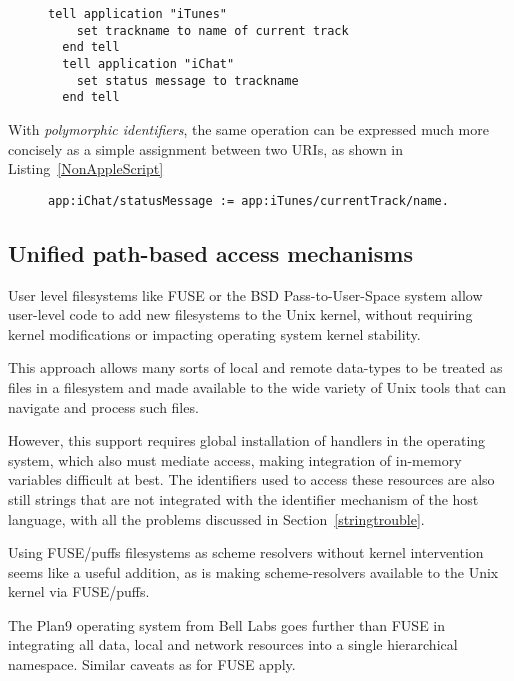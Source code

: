 \documentclass[preprint,authoryear]{acm_proc_article-sp}
\begin{document}
\begin{figure}[htbp]
\begin{lstlisting}[style=L,label= AppleScript,caption=Using AppleScript to set chat status from track name.]
  tell application "iTunes"
    set trackname to name of current track
  end tell
  tell application "iChat"
    set status message to trackname
  end tell
\end{lstlisting}
\end{figure}

With \emph{polymorphic identifiers}, the same operation can be expressed
much more concisely as a simple assignment between two URIs,
as shown in Listing~\ref{NonAppleScript}


\begin{figure}[htbp]
\begin{lstlisting}[style=L,label=NonAppleScript,caption=Access to applications via \emph{polymorphic identifiers}.]
  app:iChat/statusMessage := app:iTunes/currentTrack/name.
\end{lstlisting}
\end{figure}


\subsection{Unified path-based access mechanisms}


User level filesystems like FUSE\cite{fuse} or the BSD Pass-to-User-Space\cite{puffs} 
system allow
user-level code to add new filesystems to the Unix kernel, without requiring
kernel modifications or impacting operating system kernel stability.

This approach allows many sorts of local and remote data-types to be 
treated as files in a filesystem and made available to the wide variety
of Unix tools that can navigate and process such files.  

However, this support requires global installation of handlers in the operating
system, which also must mediate access, making integration of in-memory 
variables difficult at best.  The identifiers used to access these resources
are also still strings that are not integrated with the identifier mechanism of
the host language, with all the problems discussed in Section~\ref{stringtrouble}.

Using FUSE/puffs filesystems as scheme resolvers without kernel intervention seems
like a useful addition, as is making scheme-resolvers available to the Unix kernel
via FUSE/puffs.

The Plan9\cite{plan9names}\cite{plan9network} operating system from Bell Labs goes further than FUSE in integrating
all data, local and network resources into a single hierarchical namespace.  Similar
caveats as for FUSE apply.
\end{document}
